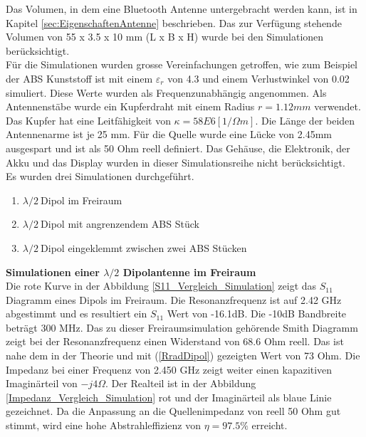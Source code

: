 Das Volumen, in dem eine Bluetooth Antenne untergebracht werden kann, ist in Kapitel \ref{sec:EigenschaftenAntenne} beschrieben. Das zur Verfügung stehende Volumen von 55 x 3.5 x 10 mm (L x B x H) wurde bei den Simulationen berücksichtigt. \\
Für die Simulationen wurden grosse Vereinfachungen getroffen, wie zum Beispiel der ABS Kunststoff ist mit einem $\varepsilon_r $ von 4.3 und einem Verlustwinkel von 0.02 simuliert. Diese Werte wurden als Frequenzunabhängig angenommen. Als Antennenstäbe wurde ein Kupferdraht mit einem Radius $r = 1.12 mm$ verwendet. Das Kupfer hat eine Leitfähigkeit von $\kappa=58E6 [1/\Omega m]$. Die Länge der beiden Antennenarme ist je 25 mm. Für die Quelle wurde eine Lücke von 2.45mm ausgespart und ist als 50 Ohm reell definiert. Das Gehäuse, die Elektronik, der Akku und das Display wurden in dieser Simulationsreihe nicht berücksichtigt.\\ 
Es wurden drei Simulationen durchgeführt.
\begin{enumerate}
\item $\lambda/2 \ $Dipol im Freiraum
\item $\lambda/2 \ $Dipol mit angrenzendem ABS Stück
\item $\lambda/2 \ $Dipol eingeklemmt zwischen zwei ABS Stücken
\end{enumerate}

\textbf{Simulationen einer $\lambda/2$ Dipolantenne im Freiraum}\\
Die rote Kurve in der Abbildung \ref{S11_Vergleich_Simulation} zeigt das $S_{11}$ Diagramm eines Dipols im Freiraum. Die Resonanzfrequenz ist auf 2.42 GHz abgestimmt und es resultiert ein $S_{11}$ Wert von -16.1dB. Die -10dB Bandbreite beträgt 300 MHz. Das zu dieser Freiraumsimulation gehörende Smith Diagramm zeigt bei der Resonanzfrequenz einen Widerstand von 68.6 Ohm reell. Das ist nahe dem in der Theorie und mit (\ref{RradDipol}) gezeigten Wert von 73 Ohm. Die Impedanz bei einer Frequenz von 2.450 GHz zeigt weiter einen kapazitiven Imaginärteil von $-j4\Omega$. Der Realteil ist in der Abbildung \ref{Impedanz_Vergleich_Simulation} rot und der Imaginärteil als blaue Linie gezeichnet. Da die Anpassung an die Quellenimpedanz von reell 50 Ohm gut stimmt, wird eine hohe Abstrahleffizienz von $\eta = 97.5 \% $ erreicht.\\



